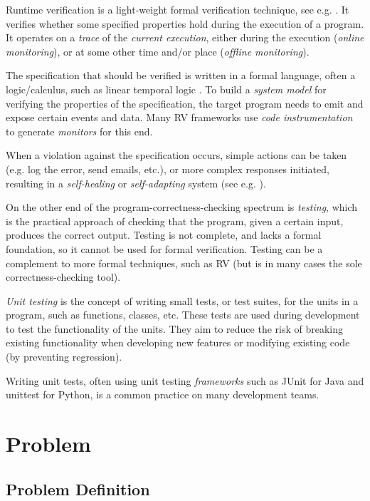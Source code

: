 \documentclass[a4paper,11pt]{article}
\begin{document}
Runtime verification is a light-weight formal verification technique, see e.g. \cite{leucker08,delgado04}.
It verifies whether some specified properties hold during the execution of a
program. It operates on a \emph{trace} of the \emph{current execution}, either
during the execution (\emph{online monitoring}), or at some other time and/or place
(\emph{offline monitoring}).

The specification that should be verified is written in a formal
language, often a logic/calculus, such as linear temporal logic
\cite{pnueli77}. To build
a \emph{system model} for verifying the properties of the specification, the target program
needs to emit and expose certain events and data. Many RV frameworks use \textit{code instrumentation}
to generate \textit{monitors} for this end.

When a violation against the specification occurs, simple actions can be taken (e.g. log the error, send emails, etc.), or more complex responses initiated, resulting in a \textit{self-healing} or \textit{self-adapting} system (see e.g. \cite{huebscher08}).

On the other end of the program-correctness-checking spectrum is \emph{testing}, which is the
practical approach of checking that the program, given a certain input, produces the correct output.
Testing is not complete, and lacks a formal foundation, so it cannot be used for formal verification. 
Testing can be a complement to more formal techniques, such as RV (but is in many cases the sole correctness-checking tool).

\textit{Unit testing} is the concept of writing small tests, or test suites, for the units in
a program, such as functions, classes, etc. These tests are used during development to test the 
functionality of the units. They aim to reduce the risk of breaking existing functionality when 
developing new features or modifying existing code (by preventing regression).

Writing unit tests, often using unit testing \textit{frameworks} such as JUnit \cite{junit}
for Java and unittest \cite{python-unittest} for Python, is a common practice on many
development teams.


\section{Problem}

\subsection{Problem Definition}
\end{document}
